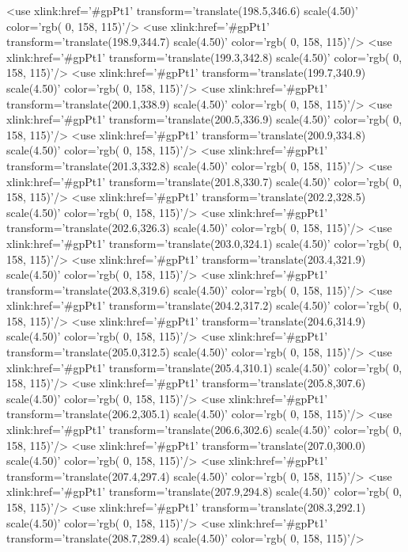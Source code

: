 	<use xlink:href='#gpPt1' transform='translate(198.5,346.6) scale(4.50)' color='rgb(  0, 158, 115)'/>
	<use xlink:href='#gpPt1' transform='translate(198.9,344.7) scale(4.50)' color='rgb(  0, 158, 115)'/>
	<use xlink:href='#gpPt1' transform='translate(199.3,342.8) scale(4.50)' color='rgb(  0, 158, 115)'/>
	<use xlink:href='#gpPt1' transform='translate(199.7,340.9) scale(4.50)' color='rgb(  0, 158, 115)'/>
	<use xlink:href='#gpPt1' transform='translate(200.1,338.9) scale(4.50)' color='rgb(  0, 158, 115)'/>
	<use xlink:href='#gpPt1' transform='translate(200.5,336.9) scale(4.50)' color='rgb(  0, 158, 115)'/>
	<use xlink:href='#gpPt1' transform='translate(200.9,334.8) scale(4.50)' color='rgb(  0, 158, 115)'/>
	<use xlink:href='#gpPt1' transform='translate(201.3,332.8) scale(4.50)' color='rgb(  0, 158, 115)'/>
	<use xlink:href='#gpPt1' transform='translate(201.8,330.7) scale(4.50)' color='rgb(  0, 158, 115)'/>
	<use xlink:href='#gpPt1' transform='translate(202.2,328.5) scale(4.50)' color='rgb(  0, 158, 115)'/>
	<use xlink:href='#gpPt1' transform='translate(202.6,326.3) scale(4.50)' color='rgb(  0, 158, 115)'/>
	<use xlink:href='#gpPt1' transform='translate(203.0,324.1) scale(4.50)' color='rgb(  0, 158, 115)'/>
	<use xlink:href='#gpPt1' transform='translate(203.4,321.9) scale(4.50)' color='rgb(  0, 158, 115)'/>
	<use xlink:href='#gpPt1' transform='translate(203.8,319.6) scale(4.50)' color='rgb(  0, 158, 115)'/>
	<use xlink:href='#gpPt1' transform='translate(204.2,317.2) scale(4.50)' color='rgb(  0, 158, 115)'/>
	<use xlink:href='#gpPt1' transform='translate(204.6,314.9) scale(4.50)' color='rgb(  0, 158, 115)'/>
	<use xlink:href='#gpPt1' transform='translate(205.0,312.5) scale(4.50)' color='rgb(  0, 158, 115)'/>
	<use xlink:href='#gpPt1' transform='translate(205.4,310.1) scale(4.50)' color='rgb(  0, 158, 115)'/>
	<use xlink:href='#gpPt1' transform='translate(205.8,307.6) scale(4.50)' color='rgb(  0, 158, 115)'/>
	<use xlink:href='#gpPt1' transform='translate(206.2,305.1) scale(4.50)' color='rgb(  0, 158, 115)'/>
	<use xlink:href='#gpPt1' transform='translate(206.6,302.6) scale(4.50)' color='rgb(  0, 158, 115)'/>
	<use xlink:href='#gpPt1' transform='translate(207.0,300.0) scale(4.50)' color='rgb(  0, 158, 115)'/>
	<use xlink:href='#gpPt1' transform='translate(207.4,297.4) scale(4.50)' color='rgb(  0, 158, 115)'/>
	<use xlink:href='#gpPt1' transform='translate(207.9,294.8) scale(4.50)' color='rgb(  0, 158, 115)'/>
	<use xlink:href='#gpPt1' transform='translate(208.3,292.1) scale(4.50)' color='rgb(  0, 158, 115)'/>
	<use xlink:href='#gpPt1' transform='translate(208.7,289.4) scale(4.50)' color='rgb(  0, 158, 115)'/>
